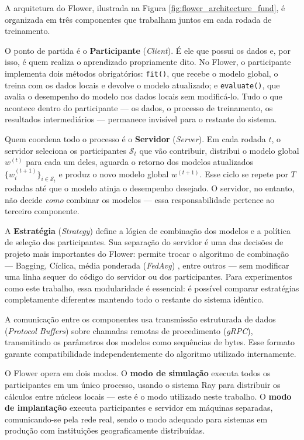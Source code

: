 A arquitetura do Flower, ilustrada na Figura \ref{fig:flower_architecture_fund}, é organizada em três componentes que trabalham juntos em cada rodada de treinamento.

O ponto de partida é o \textbf{Participante} (\textit{Client}). É ele que possui os dados e, por isso, é quem realiza o aprendizado propriamente dito. No Flower, o participante implementa dois métodos obrigatórios: \texttt{fit()}, que recebe o modelo global, o treina com os dados locais e devolve o modelo atualizado; e \texttt{evaluate()}, que avalia o desempenho do modelo nos dados locais sem modificá-lo. Tudo o que acontece dentro do participante --- os dados, o processo de treinamento, os resultados intermediários --- permanece invisível para o restante do sistema.

Quem coordena todo o processo é o \textbf{Servidor} (\textit{Server}). Em cada rodada $t$, o servidor seleciona os participantes $\mathcal{S}_t$ que vão contribuir, distribui o modelo global $w^{(t)}$ para cada um deles, aguarda o retorno dos modelos atualizados $\{w_i^{(t+1)}\}_{i \in \mathcal{S}_t}$ e produz o novo modelo global $w^{(t+1)}$. Esse ciclo se repete por $T$ rodadas até que o modelo atinja o desempenho desejado. O servidor, no entanto, não decide \emph{como} combinar os modelos --- essa responsabilidade pertence ao terceiro componente.

A \textbf{Estratégia} (\textit{Strategy}) define a lógica de combinação dos modelos e a política de seleção dos participantes. Sua separação do servidor é uma das decisões de projeto mais importantes do Flower: permite trocar o algoritmo de combinação --- Bagging, Cíclica, média ponderada (\textit{FedAvg}) \cite{mcmahan2017fedavg}, entre outros --- sem modificar uma linha sequer do código do servidor ou dos participantes. Para experimentos como este trabalho, essa modularidade é essencial: é possível comparar estratégias completamente diferentes mantendo todo o restante do sistema idêntico.

A comunicação entre os componentes usa transmissão estruturada de dados (\textit{Protocol Buffers}) sobre chamadas remotas de procedimento (\textit{gRPC}), transmitindo os parâmetros dos modelos como sequências de bytes. Esse formato garante compatibilidade independentemente do algoritmo utilizado internamente.

O Flower opera em dois modos. O \textbf{modo de simulação} executa todos os participantes em um único processo, usando o sistema Ray para distribuir os cálculos entre núcleos locais --- este é o modo utilizado neste trabalho. O \textbf{modo de implantação} executa participantes e servidor em máquinas separadas, comunicando-se pela rede real, sendo o modo adequado para sistemas em produção com instituições geograficamente distribuídas.

